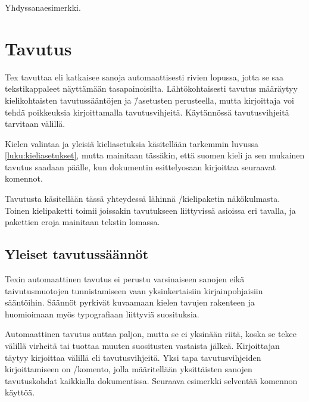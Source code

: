 \begin{tulossis}
  Yhdyssanaesimerkki.
\end{tulossis}

\section{Tavutus}
\label{luku:tavutus}

Tex tavuttaa eli katkaisee sanoja automaattisesti rivien lopussa, jotta
se saa tekstikappaleet näyttämään tasapainoisilta. Lähtökohtaisesti
tavutus määräytyy kielikohtaisten tavutussääntöjen ja \=/asetusten
perusteella, mutta kirjoittaja voi tehdä poikkeuksia kirjoittamalla
tavutusvihjeitä. Käytännössä tavutusvihjeitä tarvitaan välillä.

Kielen valintaa ja yleisiä kieliasetuksia käsitellään tarkemmin luvussa
\ref{luku:kieliasetukset}, mutta mainitaan tässäkin, että suomen kieli
ja sen mukainen tavutus saadaan päälle, kun dokumentin esittelyosaan
kirjoittaa seuraavat komennot.

\begin{koodilohkosis}
  \usepackage{polyglossia}
  \setdefaultlanguage{finnish}
\end{koodilohkosis}

Tavutusta käsitellään tässä yhteydessä lähinnä
\-/kielipaketin näkökulmasta. Toinen kielipaketti
 toimii joissakin tavutukseen liittyvissä asioissa eri
tavalla, ja pakettien eroja mainitaan tekstin lomassa.

\subsection{Yleiset tavutussäännöt}

Texin automaattinen tavutus ei perustu varsinaiseen sanojen eikä
taivutusmuotojen tunnistamiseen vaan yksinkertaisiin kirjainpohjaisiin
sääntöihin. Säännöt pyrkivät kuvaamaan kielen tavujen rakenteen ja
huomioimaan myös typografiaan liittyviä suosituksia.

Automaattinen tavutus auttaa paljon, mutta se ei yksinään riitä, koska
se tekee välillä virheitä tai tuottaa muuten suositusten vastaista
jälkeä. Kirjoittajan täytyy kirjoittaa välillä eli tavutusvihjeitä. Yksi
tapa tavutusvihjeiden kirjoittamiseen on \-/komento, jolla määritellään yksittäisten sanojen
tavutuskohdat kaikkialla dokumentissa. Seuraava esimerkki selventää
komennon käyttöä.

\begin{koodilohkosis}
\end{koodilohkosis}

